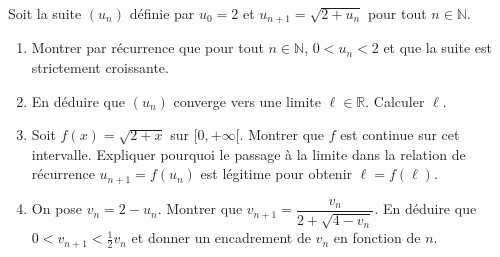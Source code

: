 \documentclass[11pt]{article}
\begin{document}
\begin{exercice}
Soit la suite $(u_n)$ définie par $u_0 = 2$ et $u_{n+1} = \sqrt{2 + u_n}$ pour tout $n \in \mathbb{N}$.
\begin{enumerate}
    \item Montrer par récurrence que pour tout $n \in \mathbb{N}$, $0 < u_n < 2$ et que la suite est strictement croissante.
    \item En déduire que $(u_n)$ converge vers une limite $\ell \in \mathbb{R}$. Calculer $\ell$.
    \item Soit $f(x) = \sqrt{2 + x}$ sur $[0, +\infty[$. Montrer que $f$ est continue sur cet intervalle. Expliquer pourquoi le passage à la limite dans la relation de récurrence $u_{n+1} = f(u_n)$ est légitime pour obtenir $\ell = f(\ell)$.
    \item On pose $v_n = 2 - u_n$. Montrer que $v_{n+1} = \dfrac{v_n}{2 + \sqrt{4 - v_n}}$. En déduire que $0 < v_{n+1} < \frac{1}{2}v_n$ et donner un encadrement de $v_n$ en fonction de $n$.
\end{enumerate}
\end{exercice}
\end{document}
